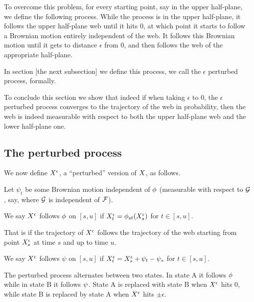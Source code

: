 {To overcome this problem, for every starting point, say in the upper
half-plane, we define the following process. While the process is in
the upper half-plane, it follows the upper half-plane web until it hits
$0$, at which point it starts to follow a Brownian motion entirely
independent of the web. It follows this Brownian motion until it gets
to distance $\epsilon$ from 0, and then follows the web of the appropriate
half-plane.

In section [the next subsection] we define this process, we call the
$\epsilon$ perturbed process, formally.

To conclude this section we show that indeed if when taking $\epsilon$
to 0, the $\epsilon$ perturbed process converges to the trajectory of
the web in probability, then the web is indeed measurable with respect
to both the upper half-plane web and the lower half-plane one.

\subsection{The perturbed process}

{
\newcommand{\joinernoargs}{\psi}
\newcommand{\joiner}[2]{\joinernoargs_{{#1}{#2}}}
\newcommand{\joinerval}[1]{\joinernoargs_{#1}}
\begin{definition}
  \label{def:resamplede}
  We now define $X^{\epsilon}$, a ``perturbed'' version of $X$, as
  follows.

  Let $\joinerval{t}$ be
  some Brownian motion independent of $\phi$ (measurable with
  respect to $\mathcal{G}$, say, where $\mathcal{G}$ is independent of
  $\mathcal{F}$).

  We say $X^{\epsilon}$ follows $\phi$ on $[s,u]$ if
  $X^{\epsilon}_t = \phi_{{s}{t}}(X^{\epsilon}_s)$ for $t \in [s,u]$.

  That is if the trajectory of $X^{\epsilon}$ follows the trajectory of
  the web starting from point $X^{\epsilon}_s$ at time $s$ and up to time $u$.

  We say $X^{\epsilon}$ follows $\joinernoargs$ on $[s,u]$ if
  $\resamplede_t = \resamplede_s + \joinerval{t} - \joinerval{s}$ for $t \in [s,u]$.

  The perturbed process alternates between two states.  In state A it follows
  $\phi$ while in state B it follows $\psi$. State A is replaced with state B
  when $X^{\epsilon}$ hits $0$, while state B is replaced by state A when
  $X^{\epsilon}$ hits $\pm \epsilon$.
\end{definition}
}

}
